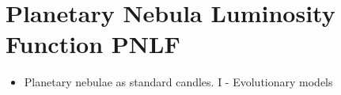 \section{Planetary Nebula Luminosity Function PNLF}

\begin{itemize}
\item Planetary nebulae as standard candles. I - Evolutionary models 
\citep[][\#148, 5/26/10]{jacoby89a}\\
\end{itemize}
